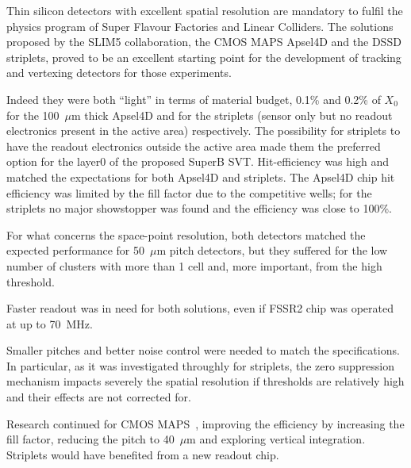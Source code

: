  Thin  silicon detectors with excellent spatial resolution  are mandatory to fulfil the physics program 
 of Super Flavour Factories and Linear Colliders. 
 The solutions proposed by the SLIM5 collaboration, the CMOS MAPS Apsel4D and the DSSD 
 striplets, proved to be an excellent starting point for the development of tracking and vertexing 
 detectors for those experiments. 
 
 Indeed they were both ``light'' in terms of material budget, 0.1\% and 0.2\% of $X_0$ for the 
 100~$\mu$m thick Apsel4D and for the striplets (sensor only but no readout electronics present in 
 the active area) respectively. The possibility for striplets to have the readout electronics outside 
 the active area made them the preferred option for the layer0 of the proposed SuperB SVT.
 Hit-efficiency was high and matched the expectations for both Apsel4D and striplets. The 
 Apsel4D chip hit efficiency was limited by the fill factor due to the competitive wells; 
 for the striplets no major showstopper was found and the efficiency was  close to 100\%.

 For what concerns 
 the space-point resolution, both detectors matched the expected performance for  50~$\mu$m pitch 
 detectors, 
 but they suffered for the low number of clusters with more than 1 cell and, more important, 
 from the high threshold. 
  
  Faster readout was in need for both solutions, even if FSSR2 chip was operated at up to 
  70~MHz.
  
 Smaller pitches and better noise control were needed to 
 match the specifications. In particular, as it was investigated throughly for striplets, the zero suppression 
 mechanism  impacts severely the spatial resolution if thresholds are relatively high and their effects are not 
 corrected for. 
 
 Research continued for CMOS MAPS~\cite{Rizzo:2013aza}, improving the efficiency by increasing 
 the fill factor, reducing the pitch to 40~$\mu$m and exploring vertical integration. 
 Striplets would have benefited from a new readout chip.

